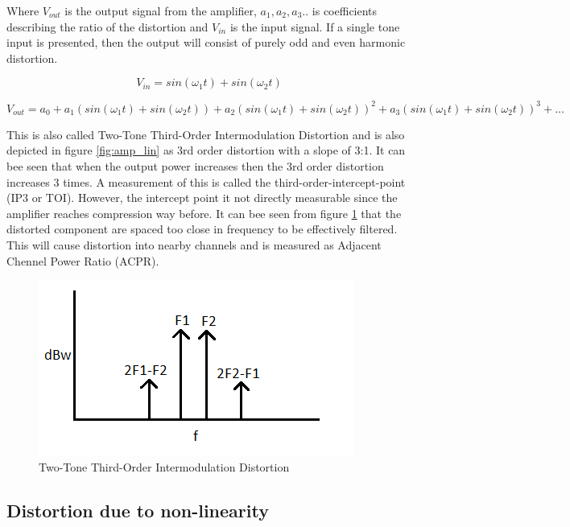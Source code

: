 Where $V_{out}$ is the output signal from the amplifier, $a_1, a_2 ,a_3..$ is coefficients describing the ratio of the distortion and $V_{in}$ is the input signal. If a single tone input is presented, then the output will consist of purely odd and even harmonic distortion. 

\begin{equation}\label{eq:dest1}
V_{in} = sin(\omega_1 t) + sin(\omega_2 t)
\end{equation} 

\begin{equation} \label{eq:dest2}
V_{out} = a_0 + a_1 (sin(\omega_1 t) + sin(\omega_2 t)) + a_2 (sin(\omega_1 t) + sin(\omega_2 t))^2 + a_3 (sin(\omega_1 t) + sin(\omega_2 t))^3 + ... 
\end{equation}

This is also called Two-Tone Third-Order Intermodulation Distortion and is also depicted in figure \ref{fig:amp_lin} as 3rd order distortion with a slope of 3:1. It can bee seen that when the output power increases then the 3rd order distortion increases 3 times. A measurement of this is called the third-order-intercept-point (IP3 or TOI). However, the intercept point it not directly measurable since the amplifier reaches compression way before. It can bee seen from figure \ref{fig:amp_psd} that the distorted component are spaced too close in frequency to be effectively filtered. This will cause distortion into nearby channels and is measured as Adjacent Chennel Power Ratio (ACPR).

\begin{figure}[H]
\centering 
\includegraphics[scale = 0.7]{figures/ch1/amp_psd.png}
\caption{Two-Tone Third-Order Intermodulation Distortion}
\label{fig:amp_psd}
\end{figure}

\subsection{Distortion due to non-linearity}

